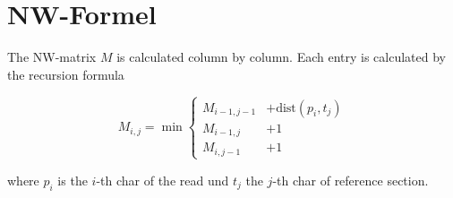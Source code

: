 \documentclass[english]{short}
\newcommand{\chardist}[2]{\ensuremath{\text{dist}(#1,#2)}}
\begin{document}
\section{NW-Formel}
The NW-matrix $M$ is calculated column by column. Each entry is calculated by the recursion formula

\[
M_{i,j} = \min \left\{\begin{array}{ll} M_{i-1,j-1} &+ \chardist{p_i}{t_j}\\ M_{i-1,j} &+ 1 \\ M_{i,j-1} &+ 1\end{array}\right. 
\]

where $p_i$ is the $i$-th char of the read und $t_j$ the $j$-th char of reference section.
\end{document}
